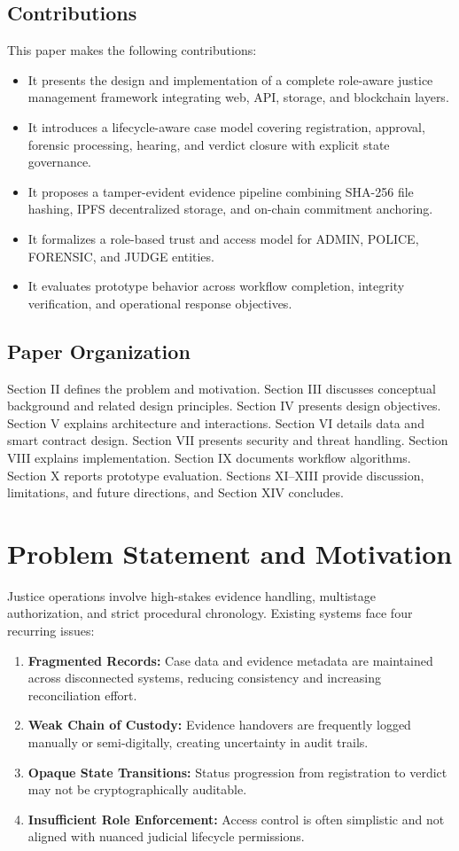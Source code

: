 \documentclass[conference]{IEEEtran}
\begin{document}
\subsection{Contributions}
This paper makes the following contributions:
\begin{itemize}
    \item It presents the design and implementation of a complete role-aware justice management framework integrating web, API, storage, and blockchain layers.
    \item It introduces a lifecycle-aware case model covering registration, approval, forensic processing, hearing, and verdict closure with explicit state governance.
    \item It proposes a tamper-evident evidence pipeline combining SHA-256 file hashing, IPFS decentralized storage, and on-chain commitment anchoring.
    \item It formalizes a role-based trust and access model for ADMIN, POLICE, FORENSIC, and JUDGE entities.
    \item It evaluates prototype behavior across workflow completion, integrity verification, and operational response objectives.
\end{itemize}

\subsection{Paper Organization}
Section II defines the problem and motivation. Section III discusses conceptual background and related design principles. Section IV presents design objectives. Section V explains architecture and interactions. Section VI details data and smart contract design. Section VII presents security and threat handling. Section VIII explains implementation. Section IX documents workflow algorithms. Section X reports prototype evaluation. Sections XI--XIII provide discussion, limitations, and future directions, and Section XIV concludes.

\section{Problem Statement and Motivation}
Justice operations involve high-stakes evidence handling, multistage authorization, and strict procedural chronology. Existing systems face four recurring issues:

\begin{enumerate}
    \item \textbf{Fragmented Records:} Case data and evidence metadata are maintained across disconnected systems, reducing consistency and increasing reconciliation effort.
    \item \textbf{Weak Chain of Custody:} Evidence handovers are frequently logged manually or semi-digitally, creating uncertainty in audit trails.
    \item \textbf{Opaque State Transitions:} Status progression from registration to verdict may not be cryptographically auditable.
    \item \textbf{Insufficient Role Enforcement:} Access control is often simplistic and not aligned with nuanced judicial lifecycle permissions.
\end{enumerate}
\end{document}
